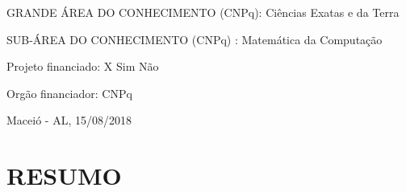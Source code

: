 \documentclass[12pt,letterpaper]{article}
\begin{document}
GRANDE ÁREA DO CONHECIMENTO (CNPq): Ciências  Exatas  e  da  Terra

SUB-ÁREA DO CONHECIMENTO (CNPq) : Matemática  da  Computação   

\vspace{0.5cm}

Projeto financiado:  \hspace*{1.5cm} X Sim \hspace*{1.5cm} Não

Orgão financiador: \hspace*{1.5cm}CNPq
\vspace*{0.8cm}

\begin{center}

Maceió - AL, 15/08/2018

\end{center}


\newpage
\section*{\centering \textbf{RESUMO}} %
\end{document}
